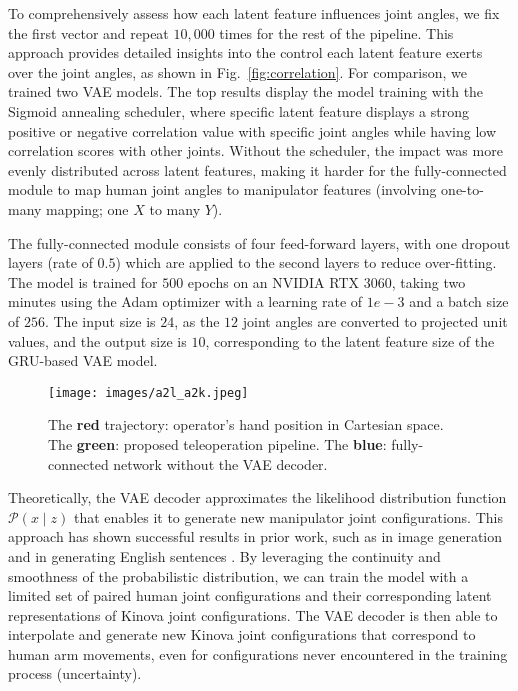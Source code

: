 To comprehensively assess how each latent feature influences joint angles, we fix the first vector and repeat $10,000$ times for the rest of the pipeline. This approach provides detailed insights into the control each latent feature exerts over the joint angles, as shown in Fig.~\ref{fig:correlation}. For comparison, we trained two VAE models. The top results display the model training with the Sigmoid annealing scheduler, where specific latent feature displays a strong positive or negative correlation value with specific joint angles while having low correlation scores with other joints. Without the scheduler, the impact was more evenly distributed across latent features, making it harder for the fully-connected module to map human joint angles to manipulator features (involving one-to-many mapping; one \(X\) to many \(Y\)).

The fully-connected module consists of four feed-forward layers, with one dropout layers (rate of $0.5$) which are applied to the second layers to reduce over-fitting. The model is trained for $500$ epochs on an NVIDIA RTX $3060$, taking two minutes using the Adam optimizer with a learning rate of $1e-3$ and a batch size of $256$. The input size is $24$, as the $12$ joint angles are converted to projected unit values, and the output size is $10$, corresponding to the latent feature size of the GRU-based VAE model.
\begin{wrapfigure}{l}{0.18\textwidth} %
    \centering
    \texttt{[image: images/a2l\_a2k.jpeg]} %
    \captionsetup{font=footnotesize}
    \caption{The \textbf{red} trajectory: operator's hand position in Cartesian space. The \textbf{green}: proposed teleoperation pipeline. The \textbf{blue}: fully-connected network without the VAE decoder.}
    \label{fig:comparsion_zx}
\vspace{-5pt}
\end{wrapfigure}

Theoretically, the VAE decoder approximates the likelihood distribution function \(\mathcal{P}({x}\mid{z})\) that enables it to generate new manipulator joint configurations. This approach has shown successful results in prior work, such as in image generation \cite{kingma_auto-encoding_2022} and in generating English sentences \cite{bowman_generating_2016}. By leveraging the continuity and smoothness of the probabilistic distribution, we can train the model with a limited set of paired human joint configurations and their corresponding latent representations of Kinova joint configurations. The VAE decoder is then able to interpolate and generate new Kinova joint configurations that correspond to human arm movements, even for configurations never encountered in the training process (uncertainty).

